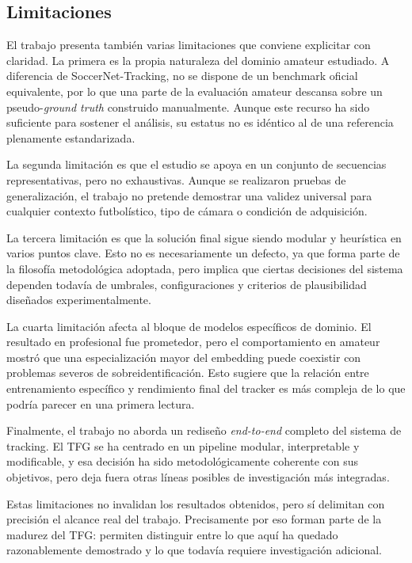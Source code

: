 \documentclass[../MAIN.tex]{subfiles}
\begin{document}
	\subsection{Limitaciones}
	
	El trabajo presenta también varias limitaciones que conviene explicitar con claridad. La primera es la propia naturaleza del dominio amateur estudiado. A diferencia de SoccerNet-Tracking, no se dispone de un benchmark oficial equivalente, por lo que una parte de la evaluación amateur descansa sobre un pseudo-\textit{ground truth} construido manualmente. Aunque este recurso ha sido suficiente para sostener el análisis, su estatus no es idéntico al de una referencia plenamente estandarizada.
	
	La segunda limitación es que el estudio se apoya en un conjunto de secuencias representativas, pero no exhaustivas. Aunque se realizaron pruebas de generalización, el trabajo no pretende demostrar una validez universal para cualquier contexto futbolístico, tipo de cámara o condición de adquisición.
	
	La tercera limitación es que la solución final sigue siendo modular y heurística en varios puntos clave. Esto no es necesariamente un defecto, ya que forma parte de la filosofía metodológica adoptada, pero implica que ciertas decisiones del sistema dependen todavía de umbrales, configuraciones y criterios de plausibilidad diseñados experimentalmente.
	
	La cuarta limitación afecta al bloque de modelos específicos de dominio. El resultado en profesional fue prometedor, pero el comportamiento en amateur mostró que una especialización mayor del embedding puede coexistir con problemas severos de sobreidentificación. Esto sugiere que la relación entre entrenamiento específico y rendimiento final del tracker es más compleja de lo que podría parecer en una primera lectura.
	
	Finalmente, el trabajo no aborda un rediseño \textit{end-to-end} completo del sistema de tracking. El TFG se ha centrado en un pipeline modular, interpretable y modificable, y esa decisión ha sido metodológicamente coherente con sus objetivos, pero deja fuera otras líneas posibles de investigación más integradas.
	
	Estas limitaciones no invalidan los resultados obtenidos, pero sí delimitan con precisión el alcance real del trabajo. Precisamente por eso forman parte de la madurez del TFG: permiten distinguir entre lo que aquí ha quedado razonablemente demostrado y lo que todavía requiere investigación adicional.
	
\end{document}
